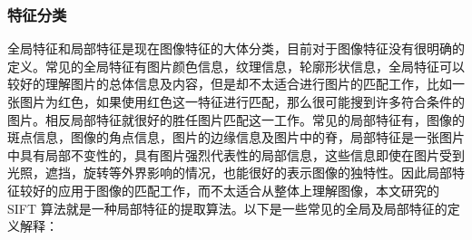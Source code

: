 \subsubsection{特征分类}
全局特征和局部特征是现在图像特征的大体分类，目前对于图像特征没有很明确的定义。常见的全局特征有图片颜色信息，纹理信息，轮廓形状信息，全局特征可以较好的理解图片的总体信息及内容，但是却不太适合进行图片的匹配工作，比如一张图片为红色，如果使用红色这一特征进行匹配，那么很可能搜到许多符合条件的图片。相反局部特征就很好的胜任图片匹配这一工作。常见的局部特征有，图像的斑点信息，图像的角点信息，图片的边缘信息及图片中的脊，局部特征是一张图片中具有局部不变性的，具有图片强烈代表性的局部信息，这些信息即使在图片受到光照，遮挡，旋转等外界影响的情况，也能很好的表示图像的独特性。因此局部特征较好的应用于图像的匹配工作，而不太适合从整体上理解图像，本文研究的SIFT 算法就是一种局部特征的提取算法。以下是一些常见的全局及局部特征的定义解释：
